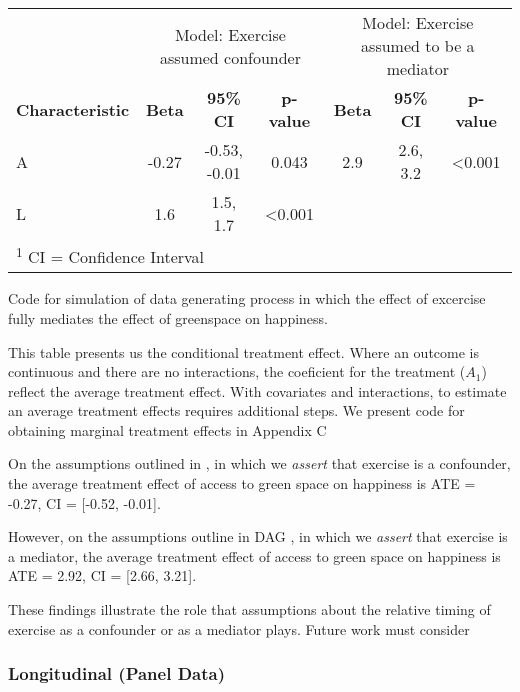 \documentclass[
  singlecolumn]{article}
\begin{document}
\begin{table}
\caption{ }\tabularnewline

\centering
\begin{tabular}{lcccccc}
\toprule
\multicolumn{1}{c}{ } & \multicolumn{3}{c}{Model: Exercise assumed confounder} & \multicolumn{3}{c}{Model: Exercise assumed to be a mediator} \\
\cmidrule(l{3pt}r{3pt}){2-4} \cmidrule(l{3pt}r{3pt}){5-7}
\textbf{Characteristic} & \textbf{Beta} & \textbf{95\% CI} & \textbf{p-value} & \textbf{Beta} & \textbf{95\% CI} & \textbf{p-value}\\
\midrule
A & -0.27 & -0.53, -0.01 & 0.043 & 2.9 & 2.6, 3.2 & <0.001\\
L & 1.6 & 1.5, 1.7 & <0.001 &  &  & \\
\bottomrule
\multicolumn{7}{l}{\rule{0pt}{1em}\textsuperscript{1} CI = Confidence Interval}\\
\end{tabular}
\end{table}

Code for simulation of data generating process in which the effect of
excercise fully mediates the effect of greenspace on happiness.

This table presents us the conditional treatment effect. Where an
outcome is continuous and there are no interactions, the coeficient for
the treatment (\(A_1\)) reflect the average treatment effect. With
covariates and interactions, to estimate an average treatment effects
requires additional steps. We present code for obtaining marginal
treatment effects in Appendix C

On the assumptions outlined in , in which we \emph{assert} that exercise
is a confounder, the average treatment effect of access to green space
on happiness is ATE = -0.27, CI = {[}-0.52, -0.01{]}.

However, on the assumptions outline in DAG , in which we \emph{assert}
that exercise is a mediator, the average treatment effect of access to
green space on happiness is ATE = 2.92, CI = {[}2.66, 3.21{]}.

These findings illustrate the role that assumptions about the relative
timing of exercise as a confounder or as a mediator plays. Future work
must consider

\subsubsection{Longitudinal (Panel Data)}\label{longitudinal-panel-data}
\end{document}
